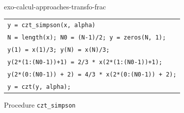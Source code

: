 \begin{correction}{exo-calcul-approaches-transfo-frac}
\begin{enumerate}
\begin{listing} \begin{footnotesize}
{\upshape
\begin{tabular}{l} \texttt{\pfunction y = czt\_simpson(x, alpha)} \\
\texttt{N = length(x); N0 = (N-1)/2; y = zeros(N, 1);} \\
\texttt{y(1) = x(1)/3; y(N) = x(N)/3;} \\
\texttt{y(2*(1:(N0-1))+1) = 2/3 * x(2*(1:(N0-1))+1);} \\
\texttt{y(2*(0:(N0-1)) + 2) = 4/3 * x(2*(0:(N0-1)) + 2);} \\
\texttt{y = czt(y, alpha);} \\
\end{tabular}
}
\end{footnotesize}
\caption{Procedure \texttt{\upshape czt\_simpson}}
\label{listing-czt-simpson}
\end{listing}
\end{enumerate}
\end{correction}
 
